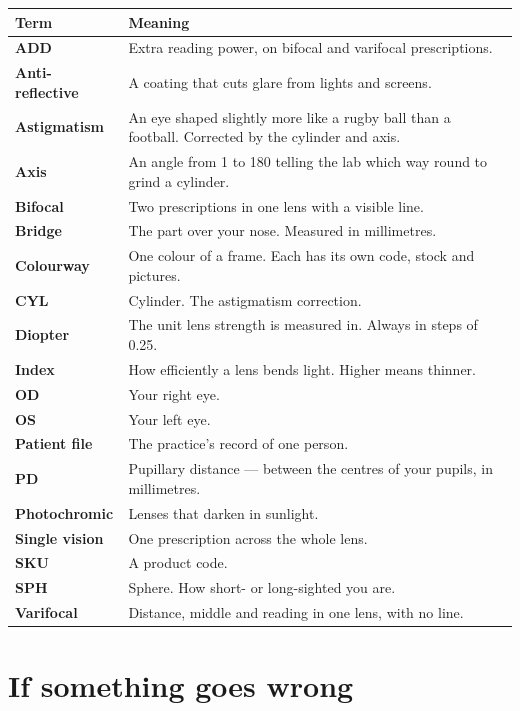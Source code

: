 \documentclass[11pt,a4paper]{report}
\begin{document}
\begin{longtable}{@{}p{}p{}@{}}
\toprule
\textbf{Term} & \textbf{Meaning} \\
\midrule
\endhead
\textbf{ADD} & Extra reading power, on bifocal and varifocal prescriptions. \\
\textbf{Anti-reflective} & A coating that cuts glare from lights and screens. \\
\textbf{Astigmatism} & An eye shaped slightly more like a rugby ball than a football. Corrected by the cylinder and axis. \\
\textbf{Axis} & An angle from 1 to 180 telling the lab which way round to grind a cylinder. \\
\textbf{Bifocal} & Two prescriptions in one lens with a visible line. \\
\textbf{Bridge} & The part over your nose. Measured in millimetres. \\
\textbf{Colourway} & One colour of a frame. Each has its own code, stock and pictures. \\
\textbf{CYL} & Cylinder. The astigmatism correction. \\
\textbf{Diopter} & The unit lens strength is measured in. Always in steps of 0.25. \\
\textbf{Index} & How efficiently a lens bends light. Higher means thinner. \\
\textbf{OD} & Your right eye. \\
\textbf{OS} & Your left eye. \\
\textbf{Patient file} & The practice's record of one person. \\
\textbf{PD} & Pupillary distance --- between the centres of your pupils, in millimetres. \\
\textbf{Photochromic} & Lenses that darken in sunlight. \\
\textbf{Single vision} & One prescription across the whole lens. \\
\textbf{SKU} & A product code. \\
\textbf{SPH} & Sphere. How short- or long-sighted you are. \\
\textbf{Varifocal} & Distance, middle and reading in one lens, with no line. \\
\bottomrule
\end{longtable}

\chapter{If something goes wrong}
\end{document}
